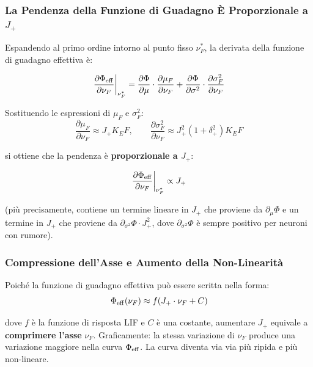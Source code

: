 \subsubsection{La Pendenza della Funzione di Guadagno È Proporzionale a $J_+$}

Espandendo al primo ordine intorno al punto fisso $\nu_F^*$, la derivata della funzione di guadagno effettiva è:

\begin{equation}
\left.\frac{\partial \Phi_{\rm eff}}{\partial \nu_F}\right|_{\nu_F^*} = \frac{\partial \Phi}{\partial \mu}\cdot \frac{\partial \mu_F}{\partial \nu_F} + \frac{\partial \Phi}{\partial \sigma^2}\cdot \frac{\partial \sigma^2_F}{\partial \nu_F}
\end{equation}

Sostituendo le espressioni di $\mu_F$ e $\sigma^2_F$:
\begin{equation}
\frac{\partial \mu_F}{\partial \nu_F} \approx J_+ K_E F, \qquad \frac{\partial \sigma^2_F}{\partial \nu_F} \approx J_+^2 (1+\delta_+^2) K_E F
\end{equation}

si ottiene che la pendenza è \textbf{proporzionale a $J_+$}:

\begin{equation}
\left.\frac{\partial \Phi_{\rm eff}}{\partial \nu_F}\right|_{\nu_F^*} \propto J_+
\end{equation}

(più precisamente, contiene un termine lineare in $J_+$ che proviene da $\partial_\mu\Phi$ e un termine in $J_+$ che proviene da $\partial_{\sigma^2}\Phi \cdot J_+^2$, dove $\partial_{\sigma^2}\Phi$ è sempre positivo per neuroni con rumore).

\subsubsection{Compressione dell'Asse e Aumento della Non-Linearità}

Poiché la funzione di guadagno effettiva può essere scritta nella forma:
\begin{equation}
\Phi_{\rm eff}(\nu_F) \approx f(J_+ \cdot \nu_F + C)
\end{equation}

dove $f$ è la funzione di risposta LIF e $C$ è una costante, aumentare $J_+$ equivale a \textbf{comprimere l'asse} $\nu_F$. Graficamente: la stessa variazione di $\nu_F$ produce una variazione maggiore nella curva $\Phi_{\rm eff}$. La curva diventa via via più ripida e più non-lineare.

